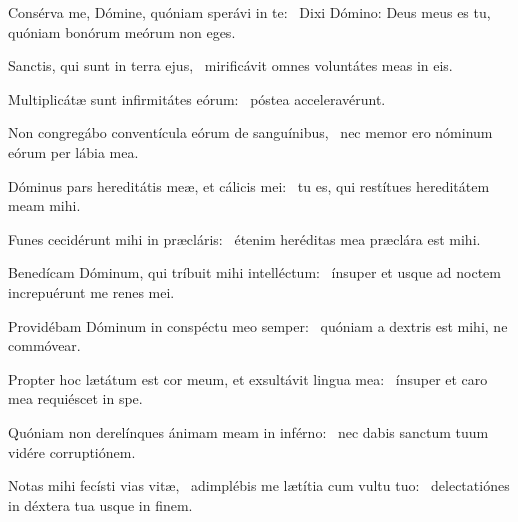 \item Consérva me, Dómine, quóniam sperávi in te:~\pscross{} Dixi Dómino: Deus meus es tu,~\psstar{} quóniam bonórum meórum non eges.

\item Sanctis, qui sunt in terra ejus,~\psstar{} mirificávit omnes voluntátes meas in eis.

\item Multiplicátæ sunt infirmitátes eórum:~\psstar{} póstea acceleravérunt.

\item Non congregábo conventícula eórum de sanguínibus,~\psstar{} nec memor ero nóminum eórum per lábia mea.

\item Dóminus pars hereditátis meæ, et cálicis mei:~\psstar{} tu es, qui restítues hereditátem meam mihi.

\item Funes cecidérunt mihi in præcláris:~\psstar{} étenim heréditas mea præclára est mihi.

\item Benedícam Dóminum, qui tríbuit mihi intelléctum:~\psstar{} ínsuper et usque ad noctem increpuérunt me renes mei.

\item Providébam Dóminum in conspéctu meo semper:~\psstar{} quóniam a dextris est mihi, ne commóvear.

\item Propter hoc lætátum est cor meum, et exsultávit lingua mea:~\psstar{} ínsuper et caro mea requiéscet in spe.

\item Quóniam non derelínques ánimam meam in inférno:~\psstar{} nec dabis sanctum tuum vidére corruptiónem.

\item Notas mihi fecísti vias vitæ,~\pscross{} adimplébis me lætítia cum vultu tuo:~\psstar{} delectatiónes in déxtera tua usque in finem.

